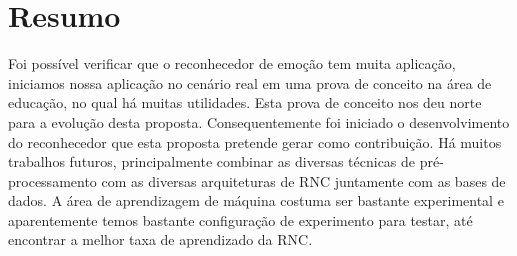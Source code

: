 \section{Resumo}\label{sec:considera}
Foi possível verificar que o reconhecedor de emoção tem muita aplicação, iniciamos nossa aplicação no cenário real em uma prova de conceito na área de educação, no qual há muitas utilidades. Esta prova de conceito nos deu norte para a evolução desta proposta. Consequentemente foi iniciado o desenvolvimento do reconhecedor que esta proposta pretende gerar como contribuição. Há muitos trabalhos futuros, principalmente combinar as diversas técnicas de pré-processamento com as diversas arquiteturas de RNC juntamente com as bases de dados. A área de aprendizagem de máquina costuma ser bastante experimental e aparentemente temos bastante configuração de experimento para testar, até encontrar a melhor taxa de aprendizado da RNC.